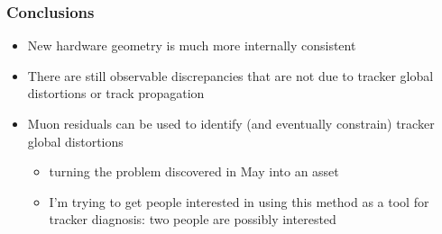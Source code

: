 \documentclass[compress]{beamer}
\begin{document}
\begin{frame}
\frametitle{Conclusions}

\begin{itemize}\setlength{\itemsep}{0.5 cm}
\item New hardware geometry is much more internally consistent

\item There are still observable discrepancies that are not due to tracker global distortions or track propagation

\item Muon residuals can be used to identify (and eventually constrain) tracker global distortions
\begin{itemize}\setlength{\itemsep}{0.25 cm}
\item turning the problem discovered in May into an asset

\item I'm trying to get people interested in using this method as a tool for tracker diagnosis: two people are possibly interested
\end{itemize}
\end{itemize}

\label{numpages}
\end{frame}
\end{document}
